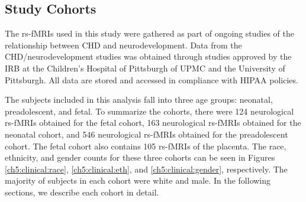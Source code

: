 \subsection{Study Cohorts}

The rs-fMRIs used in this study were gathered as part of ongoing studies of the relationship between CHD and neurodevelopment. Data from the CHD/neurodevelopment studies was obtained through studies approved by the IRB at the Children's Hospital of Pittsburgh of UPMC and the University of Pittsburgh. All data are stored and accessed in compliance with HIPAA policies.

The subjects included in this analysis fall into three age groups: neonatal, preadolescent, and fetal. To summarize the cohorts, there were 124 neurological rs-fMRIs obtained for the fetal cohort, 163 neurological rs-fMRIs obtained for the neonatal cohort, and 546 neurological rs-fMRIs obtained for the preadolescent cohort. The fetal cohort also contains 105 rs-fMRIs of the placenta. The race, ethnicity, and gender counts for these three cohorts can be seen in Figures \ref{ch5:clinical:race}, \ref{ch5:clinical:eth}, and \ref{ch5:clinical:gender}, respectively. The majority of subjects in each cohort were white and male. In the following sections, we describe each cohort in detail. 

